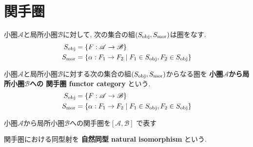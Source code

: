 \section{関手圏}
\begin{Prop}
小圏$\mathscr{A}$と局所小圏$\mathscr{B}$に対して, 次の集合の組$(S_{\rm obj},S_{\rm mor})$は圏をなす.
\begin{align*}
S_{\rm obj}&=\{F:\mathscr{A}\rightarrow\mathscr{B}\}\\
S_{\rm mor}&=\{\alpha:F_1\rightarrow F_2\mid F_1\in S_{\rm obj},F_2\in S_{\rm obj}\}
\end{align*}
\end{Prop}
\begin{comment}
\begin{proof}
\end{proof}
\end{comment}

\begin{Def}
小圏$\mathscr{A}$と局所小圏$\mathscr{B}$に対する次の集合の組$(S_{\rm obj},S_{\rm mor})$からなる圏を
{\bf 小圏$\mathscr{A}$から局所小圏$\mathscr{B}$への
関手圏 functor category
}という.
\begin{align*}
S_{\rm obj}&=\{F:\mathscr{A}\rightarrow\mathscr{B}\}\\
S_{\rm mor}&=\{\alpha:F_1\rightarrow F_2\mid F_1\in S_{\rm obj},F_2\in S_{\rm obj}\}
\end{align*}

\end{Def}
\begin{Notation}
小圏$\mathscr{A}$から局所小圏$\mathscr{B}$への関手圏を$[\mathscr{A},\mathscr{B}]$
で表す\end{Notation}
\begin{Def}
関手圏における同型射を
{\bf 
自然同型 natural isomorphism
}という.
\end{Def}
\begin{comment}
\begin{Prop}
自然変換...が自然同型であること,

...が同型者であることは同値である.
\end{Prop}
\end{comment}



